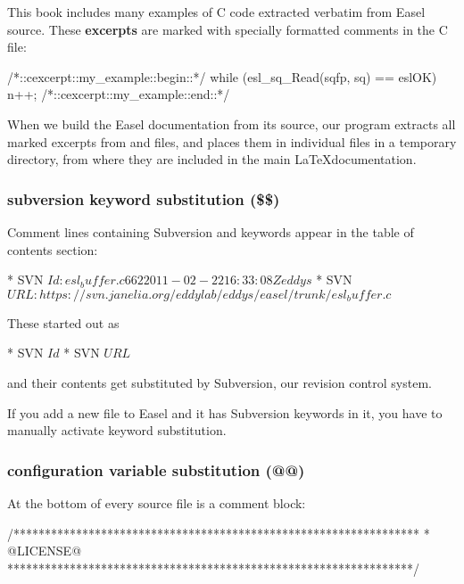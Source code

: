 This book includes many examples of C code extracted verbatim from
Easel source.  These {\bfseries excerpts} are marked with specially
formatted comments in the C file:

\begin{cchunk}
/*::cexcerpt::my_example::begin::*/
   while (esl_sq_Read(sqfp, sq) == eslOK)
     { n++; }
/*::cexcerpt::my_example::end::*/
\end{cchunk}

When we build the Easel documentation from its source, our
 program extracts all marked excerpts from 
and  files, and places them in individual files in a
temporary  directory, from where they are included
in the main \LaTeX documentation.

\subsubsection{subversion keyword substitution (\$\$)}

Comment lines containing Subversion  and 
keywords appear in the table of contents section:

\begin{cchunk}
 * SVN $Id: esl_buffer.c 662 2011-02-22 16:33:08Z eddys $
 * SVN $URL: https://svn.janelia.org/eddylab/eddys/easel/trunk/esl_buffer.c $
\end{cchunk}

These started out as
\begin{cchunk}
 * SVN $Id$
 * SVN $URL$
\end{cchunk}

and their contents get substituted by Subversion, our revision control
system.

If you add a new file to Easel and it has Subversion keywords in it,
you have to manually activate keyword substitution. 


\subsubsection{configuration variable substitution (@@)}

At the bottom of every source file is a comment block:

\begin{cchunk}
/*****************************************************************
 * @LICENSE@
 *****************************************************************/
\end{cchunk}


